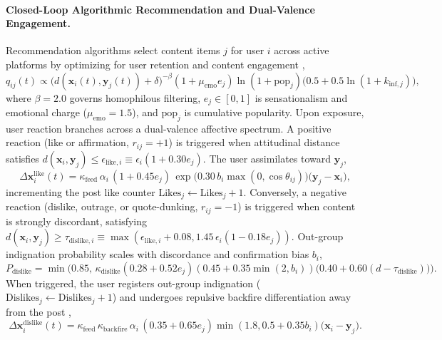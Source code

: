 \documentclass{article}
\begin{document}
\paragraph{Closed-Loop Algorithmic Recommendation and Dual-Valence Engagement.}
Recommendation algorithms select content items $j$ for user $i$ across active platforms by optimizing for user retention and content engagement \citep{brady2017emotion, vosoughi2018spread},
\begin{equation}
    q_{ij}(t) \propto \big(d(\mathbf{x}_i(t), \mathbf{y}_j(t)) + \delta\big)^{-\beta} (1 + \mu_{\mathrm{emo}} e_j) \ln(1 + \mathrm{pop}_j) \big(0.5 + 0.5\ln(1 + k_{\mathrm{inf}, j})\big),
    \label{eq:recom_prob}
\end{equation}
where $\beta = 2.0$ governs homophilous filtering, $e_j \in [0, 1]$ is sensationalism and emotional charge ($\mu_{\mathrm{emo}} = 1.5$), and $\mathrm{pop}_j$ is cumulative popularity. Upon exposure, user reaction branches across a dual-valence affective spectrum. A positive reaction (like or affirmation, $r_{ij} = +1$) is triggered when attitudinal distance satisfies $d(\mathbf{x}_i, \mathbf{y}_j) \le \epsilon_{\mathrm{like}, i} \equiv \epsilon_i (1 + 0.30 e_j)$. The user assimilates toward $\mathbf{y}_j$,
\begin{equation}
    \Delta \mathbf{x}_i^{\mathrm{like}}(t) = \kappa_{\mathrm{feed}}\,\alpha_i\,(1 + 0.45 e_j)\,\exp\!\big(0.30\,b_i \max(0, \cos\theta_{ij})\big) \big(\mathbf{y}_j - \mathbf{x}_i\big),
    \label{eq:like_assimilation}
\end{equation}
incrementing the post like counter $\mathrm{Likes}_j \leftarrow \mathrm{Likes}_j + 1$. Conversely, a negative reaction (dislike, outrage, or quote-dunking, $r_{ij} = -1$) is triggered when content is strongly discordant, satisfying $d(\mathbf{x}_i, \mathbf{y}_j) \ge \tau_{\mathrm{dislike}, i} \equiv \max(\epsilon_{\mathrm{like}, i} + 0.08, 1.45\,\epsilon_i (1 - 0.18 e_j))$. Out-group indignation probability scales with discordance and confirmation bias $b_i$,
\begin{equation}
    P_{\mathrm{dislike}} = \min\!\Big(0.85,\, \kappa_{\mathrm{dislike}}(0.28 + 0.52 e_j)(0.45 + 0.35\min(2, b_i))\big(0.40 + 0.60(d - \tau_{\mathrm{dislike}})\big)\Big).
    \label{eq:dislike_prob}
\end{equation}
When triggered, the user registers out-group indignation ($\mathrm{Dislikes}_j \leftarrow \mathrm{Dislikes}_j + 1$) and undergoes repulsive backfire differentiation away from the post \citep{bail2018exposure},
\begin{equation}
    \Delta \mathbf{x}_i^{\mathrm{dislike}}(t) = \kappa_{\mathrm{feed}}\,\kappa_{\mathrm{backfire}}\,\alpha_i\,(0.35 + 0.65 e_j) \min(1.8, 0.5 + 0.35 b_i) \big(\mathbf{x}_i - \mathbf{y}_j\big).
    \label{eq:dislike_repulsion}
\end{equation}
\end{document}
